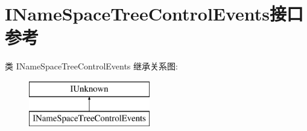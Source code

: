 \hypertarget{interface_i_name_space_tree_control_events}{}\section{I\+Name\+Space\+Tree\+Control\+Events接口 参考}
\label{interface_i_name_space_tree_control_events}
类 I\+Name\+Space\+Tree\+Control\+Events 继承关系图\+:\begin{figure}[H]
\begin{center}
\leavevmode
\includegraphics[height=2.000000cm]{interface_i_name_space_tree_control_events}
\end{center}
\end{figure}
